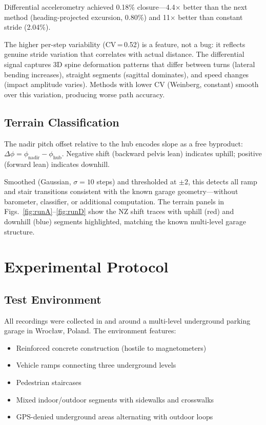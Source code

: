 \documentclass[11pt,a4paper]{article}
\begin{document}
Differential accelerometry achieved 0.18\% closure---4.4$\times$ better than
the next method (heading-projected excursion, 0.80\%) and 11$\times$ better
than constant stride (2.04\%).

The higher per-step variability (CV\,=\,0.52) is a feature, not a bug: it
reflects genuine stride variation that correlates with actual distance. The
differential signal captures 3D spine deformation patterns that differ between
turns (lateral bending increases), straight segments (sagittal dominates), and
speed changes (impact amplitude varies). Methods with lower CV
(Weinberg, constant) smooth over this variation, producing worse path accuracy.

\subsection{Terrain Classification}

The nadir pitch offset relative to the hub encodes slope as a free byproduct:
$\Delta\phi = \phi_\text{nadir} - \phi_\text{hub}$. Negative shift (backward
pelvis lean) indicates uphill; positive (forward lean) indicates downhill.

Smoothed (Gaussian, $\sigma = 10$ steps) and thresholded at
$\pm 2$\textdegree, this detects all ramp and stair transitions consistent
with the known garage geometry---without barometer, classifier, or additional
computation. The terrain panels in Figs.~\ref{fig:runA}--\ref{fig:runD} show
the NZ shift traces with uphill (red) and downhill (blue) segments
highlighted, matching the known multi-level garage structure.

\section{Experimental Protocol}
\label{sec:protocol}

\subsection{Test Environment}

All recordings were collected in and around a multi-level underground parking
garage in Wroc\l{}aw, Poland. The environment features:
\begin{itemize}[nosep]
\item Reinforced concrete construction (hostile to magnetometers)
\item Vehicle ramps connecting three underground levels
\item Pedestrian staircases
\item Mixed indoor/outdoor segments with sidewalks and crosswalks
\item GPS-denied underground areas alternating with outdoor loops
\end{itemize}
\end{document}
